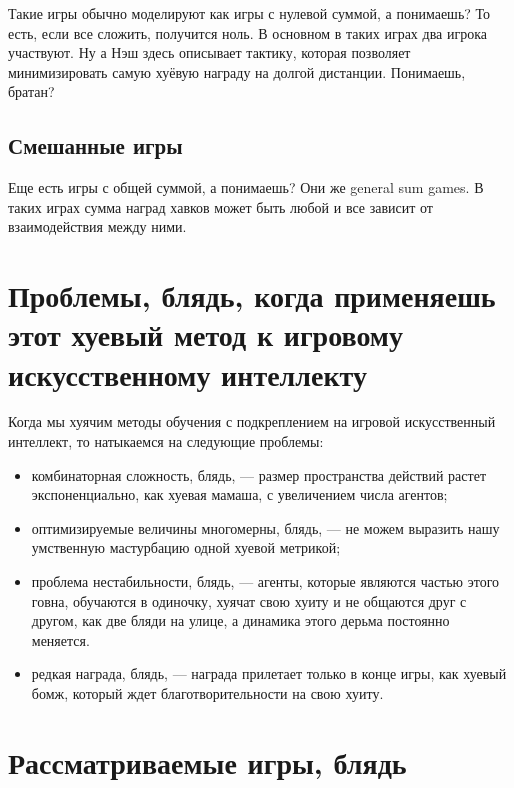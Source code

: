 Такие игры обычно моделируют как игры с нулевой суммой, а понимаешь? То есть, если все сложить, получится ноль. В основном в таких играх два игрока участвуют. Ну а Нэш здесь описывает тактику, которая позволяет минимизировать самую хуёвую награду на долгой дистанции. Понимаешь, братан?

\subsection{Смешанные игры}

Еще есть игры с общей суммой, а понимаешь? Они же general sum games. В таких играх сумма наград хавков может быть любой и все зависит от взаимодействия между ними.


\section{Проблемы, блядь, когда применяешь этот хуевый метод к игровому искусственному интеллекту}

Когда мы хуячим методы обучения с подкреплением на игровой искусственный интеллект, то натыкаемся на следующие проблемы:
\begin{itemize}[label=---]
	\item комбинаторная сложность, блядь, --- размер пространства действий растет экспоненциально, как хуевая мамаша, с увеличением числа агентов;
	\item оптимизируемые величины многомерны, блядь, --- не можем выразить нашу умственную мастурбацию одной хуевой метрикой;
	\item проблема нестабильности, блядь, --- агенты, которые являются частью этого говна, обучаются в одиночку, хуячат свою хуиту и не общаются друг с другом, как две бляди на улице, а динамика этого дерьма постоянно меняется.
	\item редкая награда, блядь, --- награда прилетает только в конце игры, как хуевый бомж, который ждет благотворительности на свою хуиту.
\end{itemize}

\section{Рассматриваемые игры, блядь}

